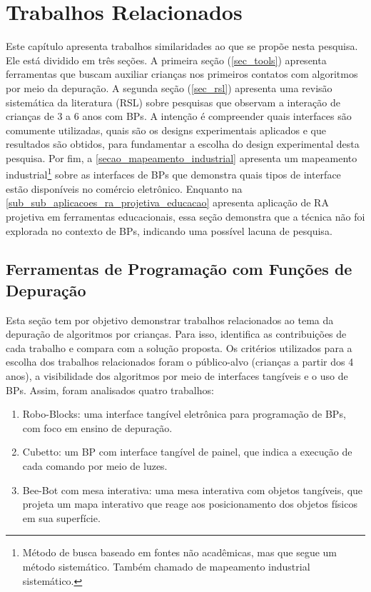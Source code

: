 \chapter{Trabalhos Relacionados}
\label{c_estado_arte}

Este capítulo apresenta trabalhos similaridades ao que se propõe nesta pesquisa. Ele está dividido em três seções. A primeira seção (\autoref{sec_tools}) apresenta ferramentas que buscam auxiliar crianças nos primeiros contatos com algoritmos por meio da depuração. A segunda seção (\autoref{sec_rsl}) apresenta uma revisão sistemática da literatura (RSL) sobre pesquisas que observam a interação de crianças de 3 a 6 anos com BPs. A intenção é compreender quais interfaces são comumente utilizadas, quais são os designs experimentais aplicados e que resultados são obtidos, para fundamentar a escolha do design experimental desta pesquisa. Por fim, a \autoref{secao_mapeamento_industrial} apresenta um mapeamento industrial\footnote{Método de busca baseado em fontes não acadêmicas, mas que segue um método sistemático. Também chamado de mapeamento industrial sistemático.} sobre as interfaces de BPs que demonstra quais tipos de interface estão disponíveis no comércio eletrônico. Enquanto na \autoref{sub_sub_aplicacoes_ra_projetiva_educacao} apresenta aplicação de RA projetiva em ferramentas educacionais, essa seção demonstra que a técnica não foi explorada no contexto de BPs, indicando uma possível lacuna de pesquisa.

\section{Ferramentas de Programação com Funções de Depuração}
\label{sec_tools}
Esta seção tem por objetivo demonstrar trabalhos relacionados ao tema da depuração de algoritmos por crianças. Para isso, identifica as contribuições de cada trabalho e compara com a solução proposta. Os critérios utilizados para a escolha dos trabalhos relacionados foram o público-alvo (crianças a partir dos 4 anos), a visibilidade dos algoritmos por meio de interfaces tangíveis e o uso de BPs. Assim, foram analisados quatro trabalhos:

\begin{enumerate}
    \item Robo-Blocks: uma interface tangível eletrônica para programação de BPs, com foco em ensino de depuração.
    \item Cubetto: um BP com interface tangível de painel, que indica a execução de cada comando por meio de luzes. 
    \item Bee-Bot com mesa interativa: uma mesa interativa com objetos tangíveis, que projeta um mapa interativo que reage aos posicionamento dos objetos físicos em sua superfície. 
\end{enumerate}

